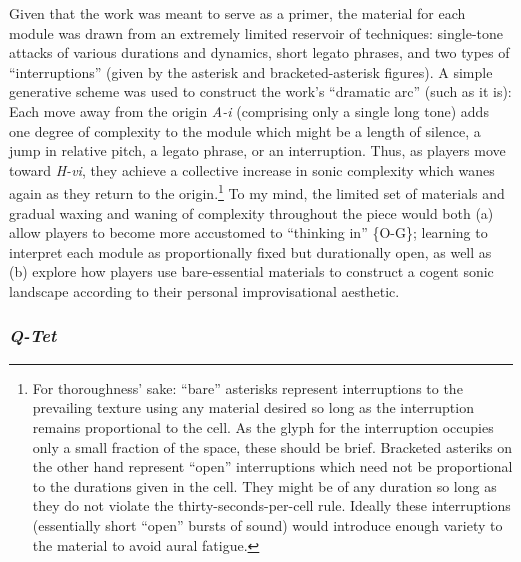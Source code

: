     Given that the work was meant to serve as a primer, the material for each module was drawn from an extremely limited reservoir of techniques: single-tone attacks of various durations and dynamics, short legato phrases, and two types of ``interruptions'' (given by the asterisk and bracketed-asterisk figures). A simple generative scheme was used to construct the work's ``dramatic arc'' (such as it is): Each move away from the origin \textit{A-i} (comprising only a single long tone) adds one degree of complexity to the module which might be a length of silence, a jump in relative pitch, a legato phrase, or an interruption. Thus, as players move toward \textit{H-vi}, they achieve a collective increase in sonic complexity which wanes again as they return to the origin.\footnote{For thoroughness' sake: ``bare'' asterisks represent interruptions to the prevailing texture using any material desired so long as the interruption remains proportional to the cell. As the glyph for the interruption occupies only a small fraction of the space, these should be brief. Bracketed asteriks on the other hand represent ``open'' interruptions which need not be proportional to the durations given in the cell. They might be of any duration so long as they do not violate the thirty-seconds-per-cell rule. Ideally these interruptions (essentially short ``open'' bursts of sound) would introduce enough variety to the material to avoid aural fatigue.} To my mind, the limited set of materials and gradual waxing and waning of complexity throughout the piece would both (a) allow players to become more accustomed to ``thinking in'' \{O-G\}; learning to interpret each module as proportionally fixed but durationally open, as well as (b) explore how players use bare-essential materials to construct a cogent sonic landscape according to their personal improvisational aesthetic.

    \subsubsection{\textit{Q-Tet}}

